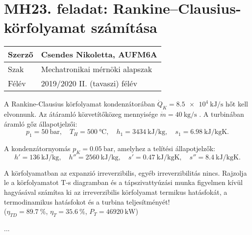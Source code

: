 \pagebreak
\section*{MH23. feladat: Rankine--Clausius-körfolyamat számítása}


\begin{tabular}{ | p{2cm} | p{14cm} | } 
	\hline
	Szerző & Csendes Nikoletta, AUFM6A \\ 
	\hline
	Szak & Mechatronikai mérnöki alapszak \\ 
	\hline
	Félév & 2019/2020 II. (tavaszi) félév \\ 
	\hline
\end{tabular}
\vspace{0.5cm}

\noindent A Rankine-Clausius körfolyamat kondenzátorában 
$\dot{Q}_{K} = \SI{8.5e4}{\kilo\joule\per\second}$ 
hőt kell elvonnunk. Az átáramló közvetítőközeg mennyisége 
$\dot{m} = \SI{40}{\kilogram\per\second}$
 . A turbinában áramló gőz állapotjelzői: \\
 
 \begin{equation*}
 	p_1 = \SI{50}{\bar}, 
 	\quad 
 	T_H = \SI{500}{\celsius}, 
 	\quad
 	h_1 = \SI{3434}{\kilo\joule\per\kilogram},
 	\quad
 	s_1 = \SI{6.98}{\kilo\joule\per\kilogram\kelvin}.
 \end{equation*}

\noindent A kondenzátornyomás ${p}_{K} = \SI{0.05}{\bar}$, amelyhez a telítési állapotjelzők:\\

\begin{equation*}
	h' = \SI{136}{\kilo\joule\per\kilogram}, 
	\quad 
	h'' = \SI{2560}{\kilo\joule\per\kilogram}, 
	\quad
	s' = \SI{0.47}{\kilo\joule\per\kilogram\kelvin},
	\quad
	s'' = \SI{8.4}{\kilo\joule\per\kilogram\kelvin}.
\end{equation*}

\noindent A körfolyamatban az expanzió irreverzibilis, egyéb irreverzibilitás nincs. Rajzolja le a körfolyamatot T-s diagramban és a tápszivattyúzási munka figyelmen kívül hagyásával számítsa ki az irreverzibilis körfolyamat termikus hatásfokát, a termodinamikus hatásfokot és a turbina teljesítményét! \\

\noindent ($\eta_{TD} = \SI{89.7}{\percent}$, \quad  $\eta_{T} = \SI{35.6}{\percent}$, \quad $P_{T} = \SI{46920}{\kilo\watt}$)

\noindent\hrulefill

...

\pagebreak